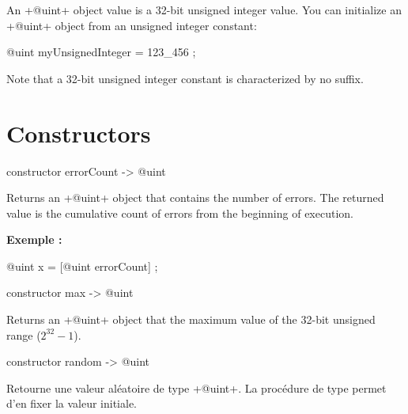 



An \ggs+@uint+ object value is a 32-bit unsigned integer value. You can initialize an \ggs+@uint+ object from an unsigned integer constant:\\

\begin{galgas}
@uint myUnsignedInteger = 123_456 ;
\end{galgas}

Note that a 32-bit unsigned integer constant is characterized by no suffix.

\section{Constructors}


\begin{galgas}
constructor errorCount -> @uint
\end{galgas}


Returns an \ggs+@uint+ object that contains the number of errors. The returned value is the cumulative count of errors from the beginning of execution.

\textbf{Exemple :}
\begin{galgas}
@uint x = [@uint errorCount] ;
\end{galgas}





\begin{galgas}
constructor max -> @uint
\end{galgas}

Returns an \ggs+@uint+ object that the maximum value of the 32-bit unsigned range ($2^{32}-1$).







\begin{galgas}
constructor random -> @uint
\end{galgas}

Retourne une valeur aléatoire de type \ggs+@uint+. La procédure de type  permet d'en fixer la valeur initiale.

